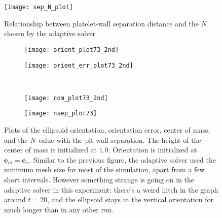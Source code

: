 \documentclass{article}
\newcommand{\vect}[1]{\boldsymbol{\mathbf{#1}}}
\begin{document}
\begin{figure}
  \centering
  \texttt{[image: sep\_N\_plot]}
  \caption{Relationship between platelet-wall separation distance and
    the $N$ chosen by the adaptive solver}
  \label{fig:sep_N_plot}
\end{figure}

\begin{figure}
  \centering
  \begin{subfigure}{0.49\textwidth}
    \texttt{[image: orient\_plot73\_2nd]}
  \end{subfigure}
  \hfill
  \begin{subfigure}{0.49\textwidth}
    \texttt{[image: orient\_err\_plot73\_2nd]}
  \end{subfigure}
  \\
  \begin{subfigure}{0.49\textwidth}
    \texttt{[image: com\_plot73\_2nd]}
  \end{subfigure}
  \hfill
  \begin{subfigure}{0.49\textwidth}
    \texttt{[image: nsep\_plot73]}
  \end{subfigure}  
  \caption{Plots of the ellipsoid orientation, orientation error,
    center of mass, and the $N$ value with the plt-wall
    separation. The height of the center of mass is initialized at
    $1.0$. Orientation is initialized at $\vect{e}_m =
    \vect{e}_x$. Similar to the previous figure, the adaptive solver
    used the minimum mesh size for most of the simulation, apart from
    a few short intervals. However something strange is going on in
    the adaptive solver in this experiment: there's a weird hitch in
    the graph around $t = 20$, and the ellipsoid stays in the vertical
    orientation for much longer than in any other run.}
  \label{fig:plt73}
\end{figure}




\end{document}
